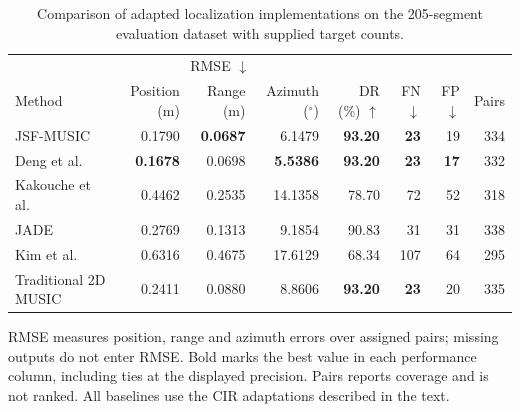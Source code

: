 \begin{table}[t]
\centering
\caption{Comparison of adapted localization implementations on the 205-segment evaluation dataset with supplied target counts.}
\label{tab:baseline}
\footnotesize
\setlength{\tabcolsep}{3pt}
\begin{tabular}{lrrrrrrr}
\hline
 & \multicolumn{3}{c}{RMSE $\downarrow$} & & & & \\ Method & Position (m) & Range (m) & Azimuth ($^\circ$) & DR (\%) $\uparrow$ & FN $\downarrow$ & FP $\downarrow$ & Pairs \\
\hline
JSF-MUSIC & 0.1790 & \textbf{0.0687} & 6.1479 & \textbf{93.20} & \textbf{23} & 19 & 334 \\
Deng et al.\ \cite{deng2023lowcomplexity} & \textbf{0.1678} & 0.0698 & \textbf{5.5386} & \textbf{93.20} & \textbf{23} & \textbf{17} & 332 \\
Kakouche et al.\ \cite{kakouche2021joint} & 0.4462 & 0.2535 & 14.1358 & 78.70 & 72 & 52 & 318 \\
JADE \cite{vanderveen1998jade} & 0.2769 & 0.1313 & 9.1854 & 90.83 & 31 & 31 & 338 \\
Kim et al.\ \cite{kim2015joint} & 0.6316 & 0.4675 & 17.6129 & 68.34 & 107 & 64 & 295 \\
Traditional 2D MUSIC \cite{wang2014successive} & 0.2411 & 0.0880 & 8.8606 & \textbf{93.20} & \textbf{23} & 20 & 335 \\
\hline
\end{tabular}
\par\smallskip\parbox{0.98\linewidth}{\scriptsize RMSE measures position, range and azimuth errors over assigned pairs; missing outputs do not enter RMSE. Bold marks the best value in each performance column, including ties at the displayed precision. Pairs reports coverage and is not ranked. All baselines use the CIR adaptations described in the text.}
\end{table}
